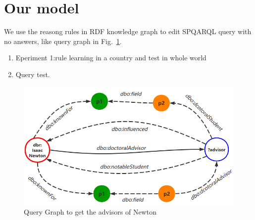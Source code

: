 \documentclass[runningheads]{llncs}
\begin{document}
\section{Our model}
We use the reasong rules in RDF knowledge graph to edit SPQARQL query with no answers, like query graph in Fig.~\ref{Newton_fig}.
\begin{enumerate}
  \item Eperiment 1:rule learning in a country and test in whole world
  \item Query test.
\end{enumerate}
\begin{figure}
\includegraphics[width=\textwidth]{Newton.png}
\caption{Query Graph to get the advisors of Newton} \label{Newton_fig}
\end{figure}




\end{document}
